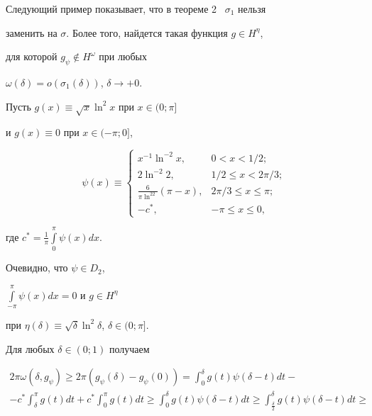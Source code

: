 Следующий пример показывает, что в теореме 2 \ $\sigma_1$ нельзя


заменить на $\sigma$. Более того, найдется такая функция $g\in H^\eta$,


для которой $g_\psi\notin H^\omega$ при любых


$\omega(\delta)=o(\sigma_1(\delta))$, $\delta\to+0$.





\begin{exam}


Пусть $g(x)\equiv\sqrt{x}\ln^2x$ при $x\in(0;\pi]$


и $g(x)\equiv0$ при $x\in(-\pi;0]$,


$$


\psi(x)\equiv


\begin{cases}


x^{-1}\ln^{-2}x,&0<x<1/2;\\


2\ln^{-2}2,&1/2\le x<2\pi/3;\\


\frac{6}{\pi\ln^22}(\pi-x),&2\pi/3\le x\le\pi;\\


-c^*,&-\pi\le x\le0,


\end{cases}


$$


где $c^*=\frac{1}{\pi}\int\limits_0^\pi\psi(x)dx$.


Очевидно, что $\psi\in D_2$,


$\int\limits_{-\pi}^\pi\psi(x)dx=0$ и $g\in H^\eta$


при $\eta(\delta)\equiv\sqrt{\delta}\ln^2\delta$, $\delta\in(0;\pi]$.


Для любых $\delta\in(0;1)$ получаем


\begin{multline*}


2\pi\omega(\delta, g_\psi)\ge 2\pi(g_\psi(\delta)-g_\psi(0))=


\int_0^\delta g(t)\psi(\delta-t)dt- \\


%


-c^*\int_\delta^\pi g(t)dt+c^*\int_0^\pi g(t)dt


\ge\int_0^\delta g(t)\psi(\delta-t)dt\ge


\int_{\frac{\delta}{2}}^\delta g(t)\psi(\delta-t)dt\ge \\



\end{multline*}
\end{exam}

